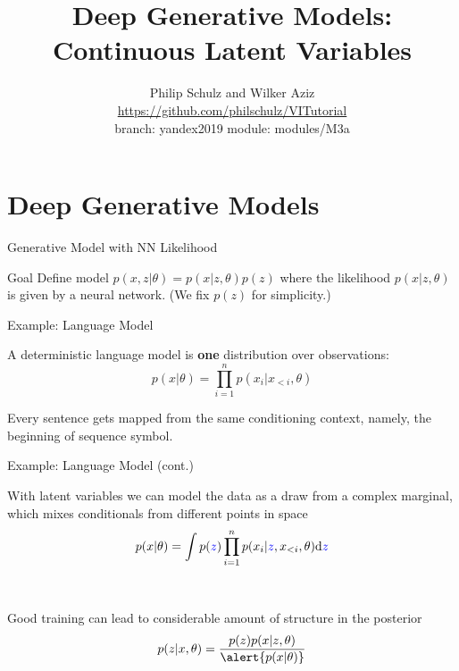 \documentclass[14pt]{beamer}
\title{Deep Generative Models: \\
Continuous Latent Variables}
\author{Philip Schulz and Wilker Aziz\\
\url{https://github.com/philschulz/VITutorial} \\
branch: yandex2019 \quad module: modules/M3a}
\date{}
\begin{document}
\begin{frame}
\maketitle
\end{frame}

\frame{\tableofcontents}

\section{Deep Generative Models}
\frame{\tableofcontents[currentsection]}


\begin{frame}{Generative Model with NN Likelihood}
\begin{block}{Goal}
Define model $ p(x,z|\theta) = p(x|z,\theta)p(z) $ where the likelihood $ p(x|z,\theta) $ is given by a neural
network. (We fix $ p(z) $ for simplicity.)
\end{block}

\end{frame}

\begin{frame}{Example: Language Model}

	A deterministic language model is {\bf one} distribution over observations:
	\begin{equation*}
		p(x|\theta) = \prod_{i=1}^n p(x_i|x_{<i}, \theta)
	\end{equation*}
	
	Every sentence gets mapped from the same conditioning context, namely, the beginning of sequence symbol.


\end{frame}

\begin{frame}{Example: Language Model (cont.)}
	
	With latent variables we can model the data as a draw from a complex marginal, which mixes conditionals from different points in space
	\begin{equation*}
		p(x|\theta) = \int p(\textcolor{blue}{z}) \prod_{i=1}^n p(x_i|\textcolor{blue}{z}, x_{<i}, \theta) \dd \textcolor{blue}{z}
	\end{equation*}
	
	~ \pause
	
	Good training can lead to considerable amount of structure in the posterior
	\begin{equation*}
		p(z|x, \theta) = \frac{p(z)p(x|z, \theta)}{\alert{p(x|\theta)}}
	\end{equation*}

\end{frame}
\end{document}
